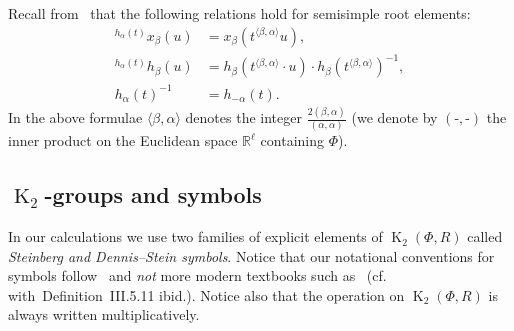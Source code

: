 \documentclass[oneside, 8pt]{amsart}
\theoremstyle{remark}
\theoremstyle{definition}
\numberwithin{lemma}{section}
\numberwithin{prop}{section}
\numberwithin{corollary}{section}
\numberwithin{externaltheorem}{section}
\DeclareMathOperator{\K}{K}
\numberwithin{equation}{section}
\begin{document}
Recall from~\cite[Lemma~5.2]{Ma69} that the following relations hold for semisimple root elements:
\begin{align} \label{eq:conj-h-x} {}^{h_\alpha(t)}\!x_\beta(u) & = x_\beta(t^{\langle \beta,  \alpha \rangle}u), \\
              \label{eq:conj-h-h} {}^{h_\alpha(t)}\!h_\beta(u) & = h_\beta(t^{\langle \beta, \alpha \rangle} \cdot u) \cdot h_\beta(t^{\langle \beta,  \alpha \rangle})^{-1}, \\
              \label{eq:h-inv}    h_\alpha(t)^{-1}             & = h_{-\alpha}(t). \end{align}
In the above formulae $\langle \beta, \alpha \rangle$ denotes the integer $\tfrac{2(\beta, \alpha)}{(\alpha, \alpha)}$ (we denote by $(\text{-},\text{-})$ the inner product on the Euclidean space $\mathbb{R}^\ell$ containing $\Phi$).

\subsection{\texorpdfstring{$\K_2$}{K2}-groups and symbols} In our calculations we use two families of explicit elements of $\K_2(\Phi, R)$ called {\it Steinberg and Dennis--Stein symbols}. Notice that our notational conventions for symbols follow~\cite{DS73} and {\it not} more modern textbooks such as~\cite{Kbook} (cf. with~Definition~III.5.11 ibid.). Notice also that the operation on $\K_2(\Phi, R)$ is always written multiplicatively.
\end{document}
